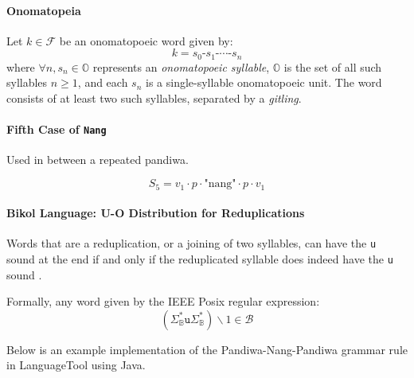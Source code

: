 \paragraph{Onomatopeia} Let \( k \in \mathcal{F} \) be an onomatopoeic word given by:
\[
      k = s_0\texttt{-}s_1\texttt{-}\cdots\texttt{-}s_n 
\]
where \(\forall n, s_n \in \mathbb{O} \) represents an \textit{onomatopoeic syllable}, \( \mathbb{O} \) is the set of all such syllables \( n \geq 1 \), and each \( s_n \) is a single-syllable onomatopoeic unit. The word consists of at least two such syllables, separated by a \textit{gitling}.

\paragraph{Fifth Case of \texttt{Nang}} Used in between a repeated pandiwa.

\[
      S_5 = v_1 \cdot p \cdot \text{"nang"} \cdot p \cdot v_1
\]

\paragraph{Bikol Language: U-O Distribution for Reduplications}
Words that are a reduplication, or a joining of two syllables, can have the \texttt{u} sound at the end if and only if the reduplicated syllable does indeed have the \texttt{u} sound \cite{bikol_dictionary}.

Formally, any word given by the IEEE Posix regular expression:
\[
      \left( \Sigma_\mathbb{B}^*\texttt{u}\Sigma_\mathbb{B}^* \right)\backslash1 \in \mathcal{B}
\]

Below is an example implementation of the Pandiwa-Nang-Pandiwa grammar rule in LanguageTool using Java.

